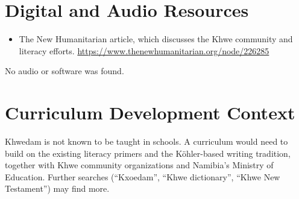\documentclass[12pt]{article}
\begin{document}
\section{Digital and Audio Resources}
\begin{itemize}
\item The New Humanitarian article, which discusses the Khwe community and literacy efforts. \url{https://www.thenewhumanitarian.org/node/226285}
\end{itemize}
No audio or software was found.

\section{Curriculum Development Context}
Khwedam is not known to be taught in schools. A curriculum would need to build on the existing literacy primers and the K\"ohler-based writing tradition, together with Khwe community organizations and Namibia's Ministry of Education. Further searches (``Kxoedam'', ``Khwe dictionary'', ``Khwe New Testament'') may find more.
\end{document}
